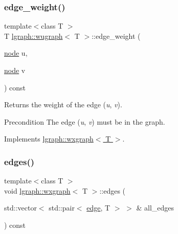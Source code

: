 \subsubsection{\texorpdfstring{edge\+\_\+weight()}{edge\_weight()}}
{\footnotesize\ttfamily template$<$class T $>$ \\
T \hyperlink{classlgraph_1_1wugraph}{lgraph\+::wugraph}$<$ T $>$\+::edge\+\_\+weight (\begin{DoxyParamCaption}\item[{\hyperlink{namespacelgraph_a397169dd66adf725210a30fb7251773e}{node}}]{u,  }\item[{\hyperlink{namespacelgraph_a397169dd66adf725210a30fb7251773e}{node}}]{v }\end{DoxyParamCaption}) const\hspace{0.3cm}{\ttfamily [virtual]}}



Returns the weight of the edge ({\itshape u}, {\itshape v}). 

\begin{DoxyPrecond}{Precondition}
The edge ({\itshape u}, {\itshape v}) must be in the graph. 
\end{DoxyPrecond}


Implements \hyperlink{classlgraph_1_1wxgraph_af5e23332680fdecb6db2fac3b3137982}{lgraph\+::wxgraph$<$ T $>$}.

\mbox{\label{classlgraph_1_1wxgraph_a1b89f56544185e33d54e72a8ed19a789}} 
\subsubsection{\texorpdfstring{edges()}{edges()}\hspace{0.1cm}{\footnotesize\ttfamily [1/2]}}
{\footnotesize\ttfamily template$<$class T $>$ \\
void \hyperlink{classlgraph_1_1wxgraph}{lgraph\+::wxgraph}$<$ T $>$\+::edges (\begin{DoxyParamCaption}\item[{std\+::vector$<$ std\+::pair$<$ \hyperlink{namespacelgraph_a76bd7d50719f03de7a85db259d80d572}{edge}, T $>$ $>$ \&}]{all\+\_\+edges }\end{DoxyParamCaption}) const\hspace{0.3cm}{\ttfamily [inherited]}}



